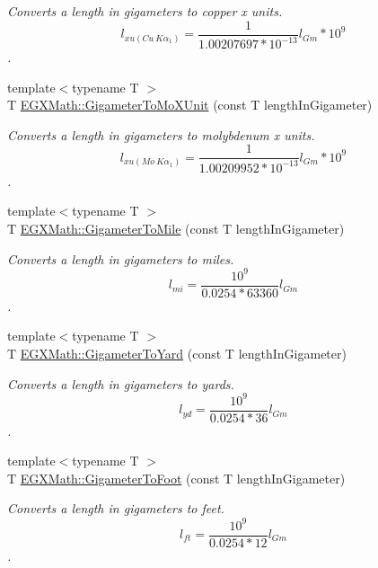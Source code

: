 \begin{DoxyCompactItemize}
\begin{DoxyCompactList}\small\item\em Converts a length in gigameters to copper x units. \[ l_{xu(Cu\ K\alpha_1)}= \frac{1}{1.00207697*10^{-13}} l_{Gm} * 10^{9}\]. \end{DoxyCompactList}\item 
{\footnotesize template$<$typename T $>$ }\\T \mbox{\hyperlink{group___e_g_x_math-_conversions-_length_conversions-_s_i-_gigameter-_non-_s_i_gac30ae06633de77b05d859ffb3cd2a577}{E\+G\+X\+Math\+::\+Gigameter\+To\+Mo\+X\+Unit}} (const T length\+In\+Gigameter)
\begin{DoxyCompactList}\small\item\em Converts a length in gigameters to molybdenum x units. \[ l_{xu(Mo\ K\alpha_1)}=\frac{1}{1.00209952*10^{-13}} l_{Gm} * 10^{9}\]. \end{DoxyCompactList}\item 
{\footnotesize template$<$typename T $>$ }\\T \mbox{\hyperlink{group___e_g_x_math-_conversions-_length_conversions-_s_i-_gigameter-_imperial_gab61b3324bc2080e5118924bffdd0d46d}{E\+G\+X\+Math\+::\+Gigameter\+To\+Mile}} (const T length\+In\+Gigameter)
\begin{DoxyCompactList}\small\item\em Converts a length in gigameters to miles. \[ l_{mi}=\frac{10^{9}}{0.0254 * 63360} l_{Gm} \]. \end{DoxyCompactList}\item 
{\footnotesize template$<$typename T $>$ }\\T \mbox{\hyperlink{group___e_g_x_math-_conversions-_length_conversions-_s_i-_gigameter-_imperial_gadc687ba83985120ec09d825adace01d6}{E\+G\+X\+Math\+::\+Gigameter\+To\+Yard}} (const T length\+In\+Gigameter)
\begin{DoxyCompactList}\small\item\em Converts a length in gigameters to yards. \[ l_{yd}= \frac{10^{9}}{0.0254 * 36} l_{Gm} \]. \end{DoxyCompactList}\item 
{\footnotesize template$<$typename T $>$ }\\T \mbox{\hyperlink{group___e_g_x_math-_conversions-_length_conversions-_s_i-_gigameter-_imperial_gaeabf3c29bcb3076a8b41986debbf046b}{E\+G\+X\+Math\+::\+Gigameter\+To\+Foot}} (const T length\+In\+Gigameter)
\begin{DoxyCompactList}\small\item\em Converts a length in gigameters to feet. \[ l_{ft}= \frac{10^{9}}{0.0254 * 12} l_{Gm} \]. \end{DoxyCompactList}\item 

\end{DoxyCompactItemize}
